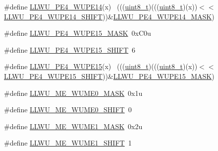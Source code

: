 \begin{DoxyCompactItemize}
\item 
\#define \hyperlink{group___l_l_w_u___register___masks_ga6d2ccf1ee3bb00a3c57a1ccb073b60b3}{L\+L\+W\+U\+\_\+\+P\+E4\+\_\+\+W\+U\+P\+E14}(x)                                          ~(((\hyperlink{_p_e___types_8h_aba7bc1797add20fe3efdf37ced1182c5}{uint8\+\_\+t})(((\hyperlink{_p_e___types_8h_aba7bc1797add20fe3efdf37ced1182c5}{uint8\+\_\+t})(x))$<$$<$\hyperlink{group___l_l_w_u___register___masks_ga1942d07f99eb5afb836650dcfb2185af}{L\+L\+W\+U\+\_\+\+P\+E4\+\_\+\+W\+U\+P\+E14\+\_\+\+S\+H\+I\+FT}))\&\hyperlink{group___l_l_w_u___register___masks_gae3a1e7b7497f719cfebd559f31dc4d07}{L\+L\+W\+U\+\_\+\+P\+E4\+\_\+\+W\+U\+P\+E14\+\_\+\+M\+A\+SK})
\item 
\#define \hyperlink{group___l_l_w_u___register___masks_ga53e48ffd153996ab89adb3c4df7511ee}{L\+L\+W\+U\+\_\+\+P\+E4\+\_\+\+W\+U\+P\+E15\+\_\+\+M\+A\+SK}~0x\+C0u
\item 
\#define \hyperlink{group___l_l_w_u___register___masks_gaeaf1e05b8de75133c46d6f11b3346732}{L\+L\+W\+U\+\_\+\+P\+E4\+\_\+\+W\+U\+P\+E15\+\_\+\+S\+H\+I\+FT}~6
\item 
\#define \hyperlink{group___l_l_w_u___register___masks_gaa8cf72eace0e0615ae08b40bbf46fa1b}{L\+L\+W\+U\+\_\+\+P\+E4\+\_\+\+W\+U\+P\+E15}(x)                                          ~(((\hyperlink{_p_e___types_8h_aba7bc1797add20fe3efdf37ced1182c5}{uint8\+\_\+t})(((\hyperlink{_p_e___types_8h_aba7bc1797add20fe3efdf37ced1182c5}{uint8\+\_\+t})(x))$<$$<$\hyperlink{group___l_l_w_u___register___masks_gaeaf1e05b8de75133c46d6f11b3346732}{L\+L\+W\+U\+\_\+\+P\+E4\+\_\+\+W\+U\+P\+E15\+\_\+\+S\+H\+I\+FT}))\&\hyperlink{group___l_l_w_u___register___masks_ga53e48ffd153996ab89adb3c4df7511ee}{L\+L\+W\+U\+\_\+\+P\+E4\+\_\+\+W\+U\+P\+E15\+\_\+\+M\+A\+SK})
\item 
\#define \hyperlink{group___l_l_w_u___register___masks_ga5f1588218d510ac13093055708ceae49}{L\+L\+W\+U\+\_\+\+M\+E\+\_\+\+W\+U\+M\+E0\+\_\+\+M\+A\+SK}~0x1u
\item 
\#define \hyperlink{group___l_l_w_u___register___masks_ga7f653f4ce89c4512437c0114f4659502}{L\+L\+W\+U\+\_\+\+M\+E\+\_\+\+W\+U\+M\+E0\+\_\+\+S\+H\+I\+FT}~0
\item 
\#define \hyperlink{group___l_l_w_u___register___masks_ga99b29643134140d21a3d4259b7f64c86}{L\+L\+W\+U\+\_\+\+M\+E\+\_\+\+W\+U\+M\+E1\+\_\+\+M\+A\+SK}~0x2u
\item 
\#define \hyperlink{group___l_l_w_u___register___masks_gac623d0db3076972370ee795830b555c1}{L\+L\+W\+U\+\_\+\+M\+E\+\_\+\+W\+U\+M\+E1\+\_\+\+S\+H\+I\+FT}~1
\item 

\end{DoxyCompactItemize}
